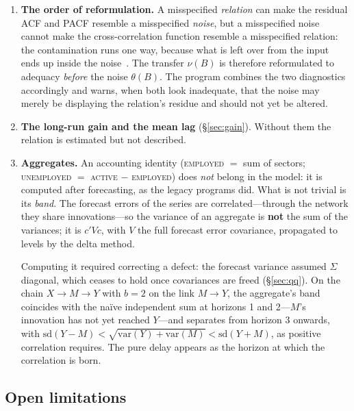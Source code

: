 \documentclass[11pt,a4paper]{article}
\theoremstyle{plain}
\theoremstyle{remark}
\begin{document}
\begin{enumerate}
\item \textbf{The order of reformulation.} A misspecified \emph{relation} can make
  the residual ACF and PACF resemble a misspecified \emph{noise}, but a misspecified
  noise cannot make the cross-correlation function resemble a misspecified relation:
  the contamination runs one way, because what is left over from the input ends up
  inside the noise~\cite[chs.~11--12]{bjr1994}. The transfer $\nu(B)$ is therefore
  reformulated to adequacy \emph{before} the noise $\theta(B)$. The program combines
  the two diagnostics accordingly and warns, when both look inadequate, that the
  noise may merely be displaying the relation's residue and should not yet be
  altered.

\item \textbf{The long-run gain and the mean lag} (\S\ref{sec:gain}). Without them
  the relation is estimated but not described.

\item \textbf{Aggregates.} An accounting identity (\textsc{employed} $=$ sum of
  sectors; \textsc{unemployed} $=$ \textsc{active} $-$ \textsc{employed}) does
  \emph{not} belong in the model: it is computed after forecasting, as the legacy
  programs did. What is not trivial is its \emph{band}. The forecast errors of the
  series are correlated---through the network they share innovations---so the
  variance of an aggregate is \textbf{not} the sum of the variances; it is
  $c'Vc$, with $V$ the full forecast error covariance, propagated to levels by the
  delta method.

  Computing it required correcting a defect: the forecast variance assumed $\Sigma$
  diagonal, which ceases to hold once covariances are freed (\S\ref{sec:qq}). On the
  chain $X\rightarrow M \rightarrow Y$ with $b=2$ on the link $M\rightarrow Y$, the
  aggregate's band coincides with the na\"ive independent sum at horizons 1 and
  2---$M$'s innovation has not yet reached $Y$---and separates from horizon 3
  onwards, with
  $\mathrm{sd}(Y-M) < \sqrt{\mathrm{var}(Y)+\mathrm{var}(M)} < \mathrm{sd}(Y+M)$, as
  positive correlation requires. The pure delay appears as the horizon at which the
  correlation is born.
\end{enumerate}

\subsection{Open limitations}
\label{sec:open}
\end{document}

